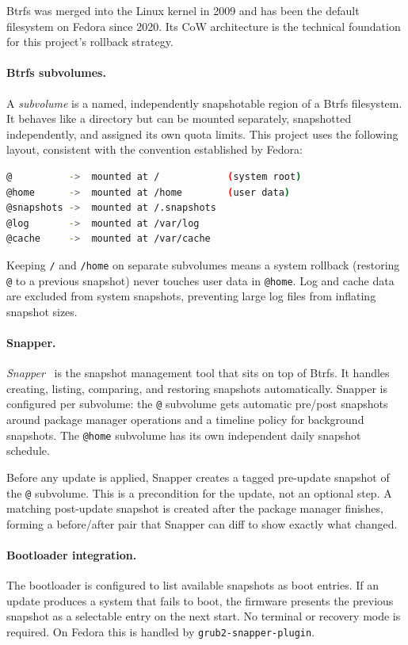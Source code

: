 Btrfs was merged into the Linux kernel in 2009 and has been the default
filesystem on Fedora since 2020. Its CoW architecture is the technical
foundation for this project's rollback strategy.

\paragraph{Btrfs subvolumes.}
A \emph{subvolume} is a named, independently snapshotable region of a Btrfs
filesystem. It behaves like a directory but can be mounted separately, snapshotted
independently, and assigned its own quota limits. This project uses the following
layout, consistent with the convention established by Fedora:

\begin{lstlisting}[language=bash]
@          ->  mounted at /            (system root)
@home      ->  mounted at /home        (user data)
@snapshots ->  mounted at /.snapshots
@log       ->  mounted at /var/log
@cache     ->  mounted at /var/cache
\end{lstlisting}

Keeping \texttt{/} and \texttt{/home} on separate subvolumes means a system
rollback (restoring \texttt{@} to a previous snapshot) never touches user data
in \texttt{@home}. Log and cache data are excluded from system snapshots,
preventing large log files from inflating snapshot sizes.

\paragraph{Snapper.}
\emph{Snapper}~\cite{archwiki:snapper}
is the snapshot management tool that sits on top of Btrfs. It handles creating,
listing, comparing, and restoring snapshots automatically. Snapper is configured
per subvolume: the \texttt{@} subvolume gets automatic pre/post snapshots around
package manager operations and a timeline policy for background snapshots. The
\texttt{@home} subvolume has its own independent daily snapshot schedule.

Before any update is applied, Snapper creates a tagged pre-update snapshot of
the \texttt{@} subvolume. This is a precondition for the update, not an optional
step. A matching post-update snapshot is created after the package manager
finishes, forming a before/after pair that Snapper can diff to show exactly what
changed.

\paragraph{Bootloader integration.}
The bootloader is configured to list available snapshots as boot entries. If an
update produces a system that fails to boot, the firmware presents the previous
snapshot as a selectable entry on the next start. No terminal or recovery mode
is required. On Fedora this is handled by \texttt{grub2-snapper-plugin}.

